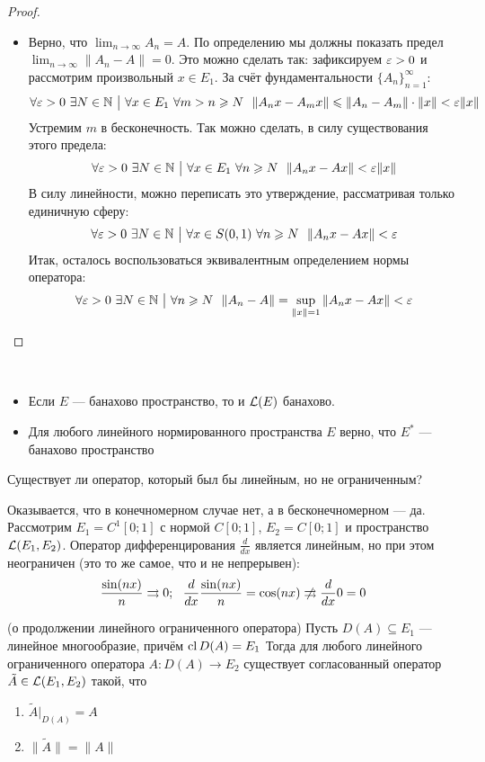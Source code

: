 \begin{proof}
\begin{enumerate}
\begin{itemize}
			\item Верно, что $\lim_{n \to \infty} A_n = A$. По определению мы должны показать предел \\ $\lim_{n \to \infty} \|A_n - A\| = 0$. Это можно сделать так: зафиксируем $\varepsilon > 0$ и рассмотрим произвольный $x \in E_1$. За счёт фундаментальности $\{A_n\}_{n = 1}^\infty$:
			\[
				\forall \varepsilon > 0\ \exists N \in \mathbb{N} \ \big|\  \forall x \in E_1\  \forall m > n \geqslant N\ \ \|A_nx - A_mx\| \leqslant \|A_n - A_m\| \cdot \|x\| < \varepsilon\|x\|
			\]
			Устремим $m$ в бесконечность. Так можно сделать, в силу существования этого предела:
			\[
				\forall \varepsilon > 0\ \exists N \in \mathbb{N} \ \big|\  \forall x \in E_1\ \forall n \geqslant N\ \ \|A_nx - Ax\| < \varepsilon \|x\|
			\]
			В силу линейности, можно переписать это утверждение, рассматривая только единичную сферу:
			\[
				\forall \varepsilon > 0\ \exists N \in \mathbb{N} \ \big|\  \forall x \in S(0, 1)\ \forall n \geqslant N\ \ \|A_nx - Ax\| < \varepsilon
			\]
			Итак, осталось воспользоваться эквивалентным определением нормы оператора:
			\[
				\forall \eps > 0\ \exists N \in \N \such \forall n \ge N\ \ \|A_n - A\| = \sup_{\|x\| = 1} \|A_nx - Ax\| < \eps
			\]
		\end{itemize}
	\end{enumerate}
\end{proof}

\begin{corollary}~
	\begin{itemize}
		\item Если $E$ --- банахово пространство, то и $\mathcal{L}(E)$ банахово.
		
		\item Для любого линейного нормированного пространства $E$ верно, что $E^*$ --- банахово пространство
	\end{itemize}
\end{corollary}

\begin{example}
	Существует ли оператор, который был бы линейным, но не ограниченным?
	
	Оказывается, что в конечномерном случае нет, а в бесконечномерном --- да. Рассмотрим $E_1 = C^1[0; 1]$ с нормой $C[0; 1]$, $E_2 = C[0; 1]$ и пространство $\mathcal{L}(E_1, E_2)$. Оператор дифференцирования $\frac{d}{dx}$ является линейным, но при этом неограничен (это то же самое, что и не непрерывен):
	\[
		\frac{\sin(nx)}{n} \rra 0;\ \ \frac{d}{dx} \frac{\sin(nx)}{n} = \cos(nx) \centernot\rra \frac{d}{dx} 0 = 0
	\]
\end{example}

\begin{theorem} (о продолжении линейного ограниченного оператора) \label{op_cont_th}
	Пусть $D(A) \subseteq E_1$ --- линейное многообразие, причём $\operatorname{cl} D(A) = E_1$ Тогда для любого линейного ограниченного оператора $A \colon D(A) \to E_2$ существует согласованный оператор $\tilde{A} \in \mathcal{L}(E_1, E_2)$ такой, что
	\begin{enumerate}
		\item $\tilde{A}|_{D(A)} = A$
		
		\item $\|\tilde{A}\| = \|A\|$
	\end{enumerate}
\end{theorem}

